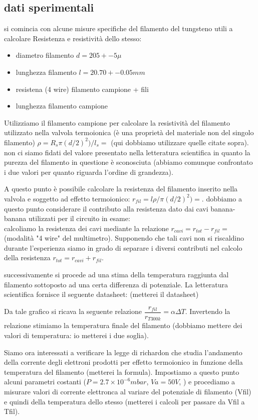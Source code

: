 \documentclass[11pt,a4paper]{article}
\begin{document}
\subsection{dati sperimentali}

si comincia con alcune misure specifiche del filamento del tungsteno utili a calcolare Resistenza e resistività dello stesso:
\begin{itemize}
\item diametro filamento ${d=205+-5\mu}$ 
\item lunghezza filamento ${l=20.70+-0.05mm}$
\item resistena (4 wire) filamento campione + fili ${}$
\item lunghezza filamento campione ${}$
\end{itemize}


Utilizziamo il filamento campione per calcolare la resistività del filamento utilizzato nella valvola termoionica (è una proprietà del materiale non del singolo filamento) $\rho=R_{s}\pi (d/2)^{2})/l_{s}=$ (qui dobbiamo utilizzare quelle citate sopra).  non ci siamo fidati del valore presentato nella letteratura scientifica in quanto la purezza del filamento in questione è sconosciuta (abbiamo comunque confrontato i due valori per quanto riguarda l'ordine di grandezza).

A questo punto è possibile calcolare la resistenza del filamento inserito nella valvola e soggetto ad effetto termoionico:
$ r_{fil}=l\rho/\pi (d/2)^{2})=$. 
dobbiamo a questo punto considerare il contributo alla resistenza dato dai cavi banana-banana utilizzati per il circuito in esame:\\
calcoliamo la resistenza dei cavi mediante la relazione $r_{cavi}=r_{tot}-r_{fil}=$(modalità "4 wire" del multimetro). Supponendo che tali cavi non si riscaldino durante l'esperienza siamo in grado di separare i diversi contributi nel calcolo della resistenza $r_{tot}=r_{cavi}+r_{fil}$.

successivamente si procede ad una stima della temperatura raggiunta dal filamento sottoposto ad una certa differenza di potenziale.
La letteratura scientifica fornisce il seguente datasheet: (metterei il datasheet)

Da tale grafico si ricava la seguente relazione $\dfrac{r_{fil}}{r_{T300k}}=\alpha \Delta T $. Invertendo la relazione stimiamo la temperatura finale del filamento (dobbiamo mettere dei valori di temperatura: io metterei i due soglia).

Siamo ora interessati a verificare la legge di richardon che studia l'andamento della corrente degli elettroni prodotti per effetto termoionico in funzione della temperatura del filamento (metterei la formula).
Impostiamo a questo punto alcuni parametri costanti (${P=2.7 \times 10^{-6} mbar}$, ${Va=50V}$, ) e procediamo a misurare valori di corrente elettronca al variare del potenziale di filamento (Vfil) e quindi della temperatura dello stesso (metterei i calcoli per passare da Vfil a Tfil).
\end{document}
